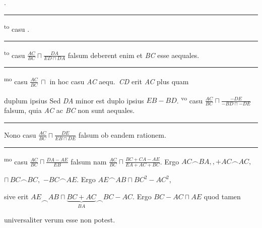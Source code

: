%
.
\pend
\rule[0cm]{40mm}{0cm}
 \textsuperscript{to} casu
%
.
\pend 
\rule[0cm]{40mm}{0cm}
\textsuperscript{to} casu 
%
$\displaystyle\frac{AC}{BC} \sqcap \displaystyle\frac{DA}{ED \sqcap D A}$ 
%
falsum deberent enim 
 et \textit{BC} esse aequales. 
\pend 
\rule[0cm]{40mm}{0cm}
\textsuperscript{mo} casu 
%
$\displaystyle\frac{AC}{BC} \,\sqcap$
%
%
%
in hoc casu \textit{AC} aequ.\ \textit{CD} erit \textit{AC} plus quam 
\rule[0cm]{0mm}{12pt}%
duplum ipsius 
 Sed \textit{DA} minor est duplo ipsius 
$EB - BD$. 
\pend 
\vspace{2mm}
\textsuperscript{vo} casu
%
$\displaystyle\frac{AC}{BC} \sqcap \displaystyle\frac{-D E}{-BD \sqcap -D E}$ 
%
falsum, quia \textit{AC} ac \textit{BC} non sunt aequales. 
\pend
\rule[0cm]{40mm}{0cm}
 \pstart
Nono casu
%
$\displaystyle\frac{AC}{BC} \sqcap \displaystyle\frac{DE}{EB \sqcap D E}$ 
%
falsum ob eandem rationem.
\pend
\rule[0cm]{40mm}{0cm}
 \textsuperscript{mo} casu
%
$\displaystyle\frac{AC}{BC} \sqcap \displaystyle\frac{DA - AE}{EB}$ 
%
falsum 
%
nam $\displaystyle\frac{AC}{BC} \sqcap \displaystyle\frac{BC+CA-AE}{EA+AC+BC}$. 
%
Ergo 
%
$AC \smallfrown BA,, + AC \smallfrown AC,$ \rule[0cm]{0mm}{12pt}%
 $\sqcap\, BC \smallfrown BC,$  $-BC \smallfrown AE$.
%
Ergo 
%
$AE \smallfrown AB \sqcap BC^2 - AC^2$, 
%
\rule[-2mm]{0mm}{8mm}sive erit
$AE \smallfrown AB \sqcap \underbrace{BC+AC}_{\displaystyle BA} \smallfrown BC - AC$.
%
Ergo
%
$BC - AC \sqcap AE$
%
quod tamen 
\rule[0cm]{0mm}{10pt}%
universaliter verum esse non potest.%
%
\pend
\vspace{0.5mm}

